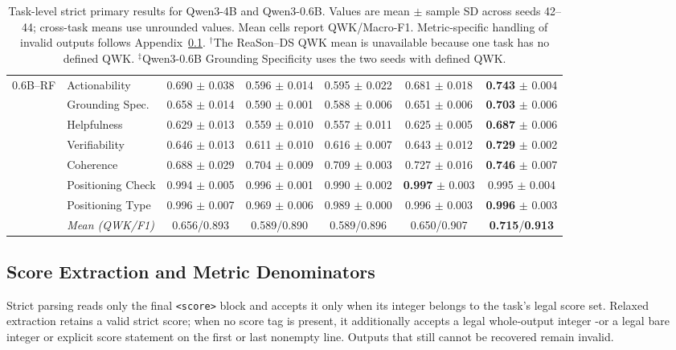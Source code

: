 \begin{table}[!t]
{\begin{tabular*}{\textwidth}{@{\extracolsep{\fill}}clccccc@{}}
\multirow{8}{*}{0.6B--RF}
& Actionability & 0.690 $\pm$ 0.038 & 0.596 $\pm$ 0.014 & 0.595 $\pm$ 0.022 & 0.681 $\pm$ 0.018 & \textbf{0.743} $\pm$ 0.004 \\
& Grounding Spec. & 0.658 $\pm$ 0.014 & 0.590 $\pm$ 0.001 & 0.588 $\pm$ 0.006 & 0.651 $\pm$ 0.006 & \textbf{0.703} $\pm$ 0.006 \\
& Helpfulness & 0.629 $\pm$ 0.013 & 0.559 $\pm$ 0.010 & 0.557 $\pm$ 0.011 & 0.625 $\pm$ 0.005 & \textbf{0.687} $\pm$ 0.006 \\
& Verifiability & 0.646 $\pm$ 0.013 & 0.611 $\pm$ 0.010 & 0.616 $\pm$ 0.007 & 0.643 $\pm$ 0.012 & \textbf{0.729} $\pm$ 0.002 \\
\cmidrule(lr){2-7}
& Coherence & 0.688 $\pm$ 0.029 & 0.704 $\pm$ 0.009 & 0.709 $\pm$ 0.003 & 0.727 $\pm$ 0.016 & \textbf{0.746} $\pm$ 0.007 \\
& Positioning Check & 0.994 $\pm$ 0.005 & 0.996 $\pm$ 0.001 & 0.990 $\pm$ 0.002 & \textbf{0.997} $\pm$ 0.003 & 0.995 $\pm$ 0.004 \\
& Positioning Type & 0.996 $\pm$ 0.007 & 0.969 $\pm$ 0.006 & 0.989 $\pm$ 0.000 & 0.996 $\pm$ 0.003 & \textbf{0.996} $\pm$ 0.003 \\
& \textit{Mean (QWK/F1)} & 0.656/0.893 & 0.589/0.890 & 0.589/0.896 & 0.650/0.907 & \textbf{0.715}/\textbf{0.913} \\
\bottomrule
\end{tabular*}
}

\caption{Task-level strict primary results for Qwen3-4B and Qwen3-0.6B.
Values are mean $\pm$ sample SD across seeds 42--44; cross-task means use
unrounded values. Mean cells report QWK/Macro-F1. Metric-specific handling
of invalid outputs follows Appendix~\ref{app:score-extraction}.
$^{\dagger}$The ReaSon--DS QWK mean is unavailable because one task has no
defined QWK. $^{\ddagger}$Qwen3-0.6B Grounding Specificity uses the two seeds
with defined QWK.}
\label{tab:full-method-task-level}
\label{tab:full-method-task-level-06b}
\end{table}

\subsection{Score Extraction and Metric Denominators}
\label{app:score-extraction}

Strict parsing reads only the final \texttt{<score>} block and accepts it only
when its integer belongs to the task's legal score set. Relaxed extraction
retains a valid strict score; when no score tag is present, it additionally
accepts a legal whole-output integer -or a legal bare integer or explicit score
statement on the first or last nonempty line. Outputs that still cannot be
recovered remain invalid.

